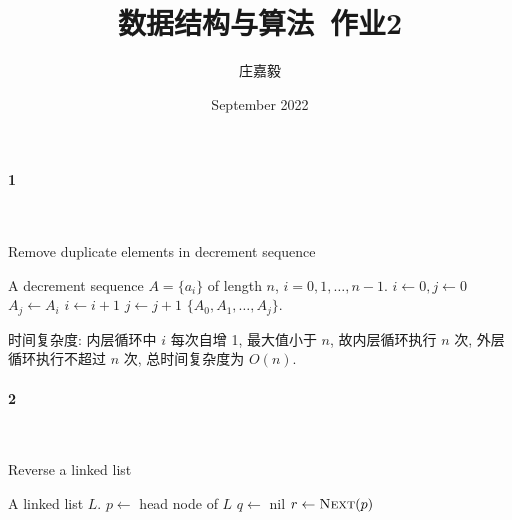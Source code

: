 \documentclass{ctexart}
\title{数据结构与算法~作业2}
\author{庄嘉毅}
\date{September 2022}
\def\conj{\mathrel{\wedge}}
\begin{document}
\maketitle

\paragraph*{1} ~

\begin{algorithm}[ht]
    \renewcommand{\algorithmicrequire}{\textbf{Input:}}
    \renewcommand{\algorithmicensure}{\textbf{Output:}}
    \caption{Remove duplicate elements in decrement sequence}
    \begin{algorithmic}
        \REQUIRE A decrement sequence $A=\{a_i\}$ of length $n$, $i=0,1,\ldots, n-1$.
        \STATE $i \gets 0, j \gets 0$
        \STATE $A_j \gets A_i$
        \WHILE{$i < n \conj A_i = A_j$}
        \STATE $i \gets i + 1$
        \ENDWHILE
        \STATE $j \gets j + 1$
        \ENDWHILE
        \ENSURE $\{A_0, A_1,\ldots, A_j\}$.
    \end{algorithmic}
\end{algorithm}

时间复杂度: 内层循环中 $i$ 每次自增 1, 最大值小于 $n$, 故内层循环执行
$n$ 次, 外层循环执行不超过 $n$ 次, 总时间复杂度为 $O(n)$.

\paragraph*{2} ~

\begin{algorithm}[ht]
    \renewcommand{\algorithmicrequire}{\textbf{Input:}}
    \renewcommand{\algorithmicensure}{\textbf{Output:}}
    \caption{Reverse a linked list}
    \begin{algorithmic}
        \REQUIRE A linked list $L$.
        \STATE $p \gets$ head node of $L$
        \STATE $q \gets$ nil
        \STATE $r \gets \textsc{Next}(p)$ 
        \ENDWHILE
    \end{algorithmic}
\end{algorithm}
\end{document}
